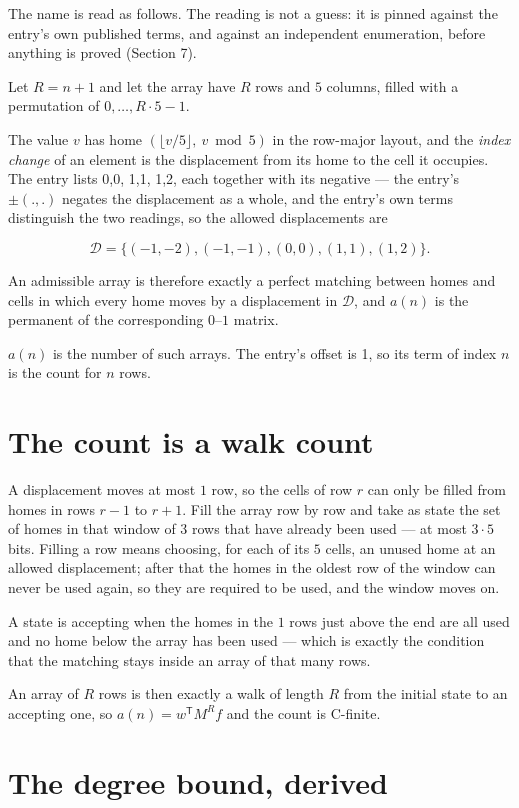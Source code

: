\documentclass[11pt]{article}
\theoremstyle{definition}
\begin{document}
The name is read as follows. The reading is not a guess: it is pinned against the entry's own published terms, and against an independent enumeration, before anything is proved (Section 7).

Let $R = n + 1$ and let the array have $R$ rows and $5$ columns, filled with a permutation of $0,\dots,R\cdot5-1$.

The value $v$ has home $(\lfloor v/5\rfloor,\ v \bmod 5)$ in the row-major layout, and the {\itshape index change} of an element is the displacement from its home to the cell it occupies. The entry lists 0,0, 1,1, 1,2, each together with its negative --- the entry's $\pm(.,.)$ negates the displacement as a whole, and the entry's own terms distinguish the two readings, so the allowed displacements are

\[\mathcal{D} = \{(-1,-2), (-1,-1), (0,0), (1,1), (1,2)\}.\]

An admissible array is therefore exactly a perfect matching between homes and cells in which every home moves by a displacement in $\mathcal{D}$, and $a(n)$ is the permanent of the corresponding $0$--$1$ matrix.

$a(n)$ is the number of such arrays. The entry's offset is 1, so its term of index $n$ is the count for $n$ rows.

\section{The count is a walk count}

A displacement moves at most $1$ row, so the cells of row $r$ can only be filled from homes in rows $r-1$ to $r+1$. Fill the array row by row and take as state the set of homes in that window of $3$ rows that have already been used --- at most $3\cdot5$ bits. Filling a row means choosing, for each of its $5$ cells, an unused home at an allowed displacement; after that the homes in the oldest row of the window can never be used again, so they are required to be used, and the window moves on.

A state is accepting when the homes in the $1$ rows just above the end are all used and no home below the array has been used --- which is exactly the condition that the matching stays inside an array of that many rows.

An array of $R$ rows is then exactly a walk of length $R$ from the initial state to an accepting one, so $a(n) = w^{\mathsf T}M^{R}f$ and the count is C-finite.

\section{The degree bound, derived}
\end{document}
